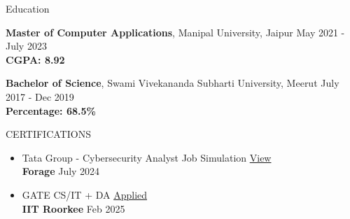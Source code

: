 \documentclass{resume} %
\begin{document}
\begin{rSection}{Education}

{\bf Master of Computer Applications}, Manipal University, Jaipur \hfill {May 2021 - July 2023}\\
\textbf{CGPA: 8.92}

{\bf Bachelor of Science}, Swami Vivekananda Subharti University, Meerut \hfill {July 2017 - Dec 2019}\\
\textbf{Percentage: 68.5\%}



\end{rSection}
\begin{rSection}{CERTIFICATIONS}
\begin{itemize}
    \item Tata Group - Cybersecurity Analyst Job Simulation \hfill \href{https://forage-uploads-prod.s3.amazonaws.com/completion-certificates/Tata/gmf3ypEXBj2wvfQWC_Tata%20Group_PynkGwAqrec2LCHy3_1719852016860_completion_certificate.pdf}{View}\\
    \textbf{Forage} \hfill July 2024
    \item GATE CS/IT + DA \hfill \href{https://}{Applied}\\
    \textbf{IIT Roorkee} \hfill Feb 2025
\end{itemize}
\end{rSection}
\end{document}
